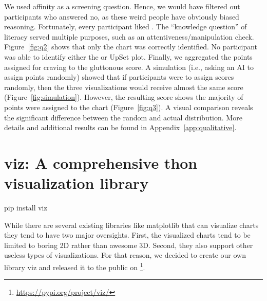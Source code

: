 \documentclass[11pt,letterpaper]{article}
\def\pie{}%
\newcommand{\pie}{{\fontspec{Symbola}\char"1F967}}
\begin{document}
We used \pie{} affinity as a screening question. Hence, we would have filtered out participants who answered no, as these weird people have obviously biased reasoning. Fortunately, every participant liked \pie{}\pie{}. The ``knowledge question'' of \pie{} literacy served multiple purposes, such as an attentiveness/manipulation check. Figure~\ref{fig:q2} shows that only the \pie{}chart was correctly identified. No participant was able to identify either the \venn{} or UpSet plot. Finally, we aggregated the points assigned for \pie{} craving to the gluttonous score. A simulation (i.e., asking an AI to assign points randomly) showed that if participants were to assign scores randomly, then the three visualizations would receive almost the same score (Figure~\ref{fig:simulation}). However, the resulting score shows the majority of points were assigned to the \pie{}chart (Figure~\ref{fig:q3}). A visual comparison reveals the significant difference between the random and actual distribution. More details and additional results can be found in Appendix~\ref{app:qualitative}.
































\section{\pie{}viz: A comprehensive \pie{}thon visualization library}
\epigraph{pip install \pie{}viz}{}
\noindent
While there are several existing libraries like matplotlib that can visualize \pie{}charts they tend to have two major oversights. First, the visualized \pie{}charts tend to be limited to boring 2D rather than awesome 3D. Second, they also support other useless types of visualizations. For that reason, we decided to create our own library \pie{}viz and released it to the public on \pie{}\pie{}\footnote{\href{https://pypi.org/project/pieviz/}{https://pypi.org/project/\pie{}viz/}}.\\ %
\end{document}
